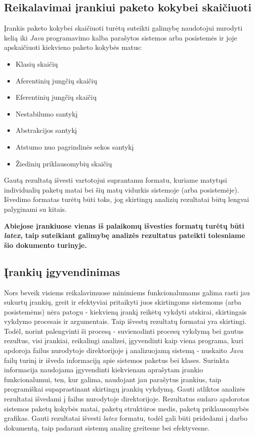 \subsection{Reikalavimai įrankiui paketo kokybei skaičiuoti}
Įrankis paketo kokybei skaičiuoti turėtų suteikti galimybę naudotojui nurodyti kelią iki \textit{Java} programavimo kalba parašytos sistemos arba posistemės ir joje
apskaičiuoti kiekvieno paketo kokybės matus:
\begin{itemize}
    \item Klasių skaičių
    \item Aferentinių jungčių skaičių
    \item Eferentinių jungčių skaičių
    \item Nestabilumo santykį
    \item Abstrakcijos santykį
    \item Atstumo nuo pagrindinės sekos santykį
    \item Žiedinių priklausomybių skaičių
\end{itemize}
Gautą rezultatą išvesti vartotojui suprantamu formatu, kuriame matytųsi individualių paketų matai bei šių matų vidurkis sistemoje (arba posistemėje).
Išvedimo formatas turėtų būti toks, jog skirtingų analizių rezultatai būtų lengvai palyginami su kitais.

\textbf{Abiejose įrankiuose vienas iš palaikomų išvesties formatų turėtų būti \textit{latex}, taip suteikiant galimybę analizės rezultatus pateikti tolesniame šio dokumento turinyje.}

\subsection{Įrankių įgyvendinimas}
Nors beveik visiems reikalavimuose minimiems funkcionalumams galima rasti jau sukurtų įrankių, greit ir efektyviai pritaikyti juos skirtingoms sistemoms
(arba posistemėms) nėra patogu - kiekvieną įrankį reikėtų vykdyti atskirai, skirtingais vykdymo procesais ir argumentais.
Taip išvestų rezultatų formatai yra skirtingi.
Todėl, norint palengvinti ši procesą - suvienodinti procesų vykdymą bei gautus rezultus, visi įrankiai, reikalingi analizei, įgyvendinti kaip viena programa, kuri
apdoroja failus nurodytoje direktorijoje į analizuojamą sistemą - nuskaito \textit{Java} failų turinį ir išveda informaciją apie sistemos paketus bei klases.
Surinkta informacija naudojama įgyvendinti kiekvienam aprašytam įrankio funkcionalumui, ten, kur galima, naudojant jau parašytus įrankius, taip programiškai supaprastinant
skirtingų įrankių vykdymą.
Gauti atliktos analizės rezultatai išvedami į failus nurodytoje direktorijoje.
Rezultatus sudaro apdorotos sistemos paketų kokybės matai, paketų struktūros medis, paketų priklausomybės grafikas.
Gauti rezultatai išvesti \textit{latex} formatu, todėl gali būti pridedami į darbo dokumentą, taip padarant sistemų analizę greitesne bei efektyvesne.



